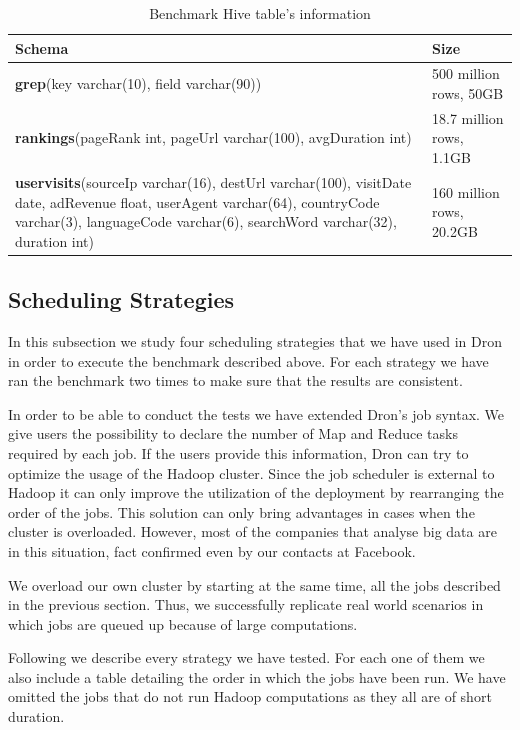 \documentclass[11pt,a4paper,twoside]{report}
\begin{document}
\begin{table}[h]
\centering
\begin{tabular}{|p{9.8cm}|p{2.9cm}|}
\hline
\textbf{Schema} & \textbf{Size} \\ \hline
\textbf{grep}(key varchar(10), field varchar(90)) & 500 million rows, 50GB \\ \hline
\textbf{rankings}(pageRank int, pageUrl varchar(100), avgDuration int) & 18.7 million rows, 1.1GB \\ \hline
\textbf{uservisits}(sourceIp varchar(16), destUrl varchar(100), 
visitDate date, adRevenue float, userAgent varchar(64), 
countryCode \mbox{varchar(3)}, languageCode varchar(6), 
searchWord varchar(32), duration int) & 160 million rows, 20.2GB \\ \hline
\end{tabular}
\caption{Benchmark Hive table's information}
\label{tab:TestHiveTables}
\end{table}

\subsection{Scheduling Strategies}
In this subsection we study four scheduling strategies that we have used in Dron in order to execute the benchmark described above. For each strategy we have ran the benchmark two times to make sure that the results are consistent.


In order to be able to conduct the tests we have extended Dron's job syntax. We give users the possibility to declare the number of Map and Reduce tasks required by each job. If the users provide this information, Dron can try to optimize the usage of the Hadoop cluster. Since the job scheduler is external to Hadoop it can only improve the utilization of the deployment by rearranging the order of the jobs. This solution can only bring advantages in cases when the cluster is overloaded. However, most of the companies that analyse big data are in this situation, fact confirmed even by our contacts at Facebook.


We overload our own cluster by starting at the same time, all the jobs described in the previous section. Thus, we successfully replicate real world scenarios in which jobs are queued up because of large computations.


Following we describe every strategy we have tested. For each one of them we also include a table detailing the order in which the jobs have been run. We have omitted the jobs that do not run Hadoop computations as they all are of short duration.
\end{document}
